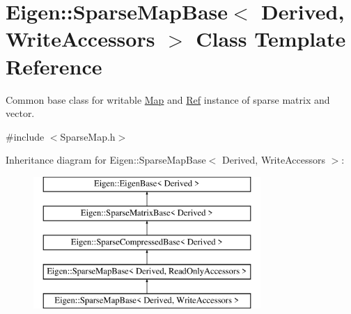 \hypertarget{class_eigen_1_1_sparse_map_base_3_01_derived_00_01_write_accessors_01_4}{}\section{Eigen\+::Sparse\+Map\+Base$<$ Derived, Write\+Accessors $>$ Class Template Reference}
\label{class_eigen_1_1_sparse_map_base_3_01_derived_00_01_write_accessors_01_4}


Common base class for writable \mbox{\hyperlink{class_eigen_1_1_map}{Map}} and \mbox{\hyperlink{class_eigen_1_1_ref}{Ref}} instance of sparse matrix and vector.  




{\ttfamily \#include $<$Sparse\+Map.\+h$>$}

Inheritance diagram for Eigen\+::Sparse\+Map\+Base$<$ Derived, Write\+Accessors $>$\+:\begin{figure}[H]
\begin{center}
\leavevmode
\includegraphics[height=5.000000cm]{class_eigen_1_1_sparse_map_base_3_01_derived_00_01_write_accessors_01_4}
\end{center}
\end{figure}
